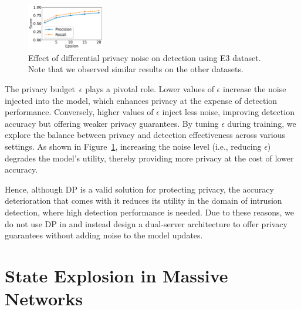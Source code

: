 \begin{figure}[!t]
  \centering
  \includegraphics[width=0.3\textwidth]{fig/epsvsscore.pdf}
  \caption{Effect of differential privacy noise on detection using E3 dataset. Note that we observed similar results on the other datasets.}
  \label{epsvsscore}
  \vspace{-2ex}
\end{figure}


The privacy budget~$\epsilon$ plays a pivotal role. Lower values of $\epsilon$ increase the noise injected into the model, which enhances privacy at the expense of detection performance. Conversely, higher values of $\epsilon$ inject less noise, improving detection accuracy but offering weaker privacy guarantees. By tuning $\epsilon$ during training, we explore the balance between privacy and detection effectiveness across various settings. As shown in Figure~\ref{epsvsscore}, increasing the noise level (i.e., reducing $\epsilon$) degrades the model’s utility, thereby providing more privacy at the cost of lower accuracy.

Hence, although DP is a valid solution for protecting privacy, the accuracy deterioration that comes with it reduces its utility in the domain of intrusion detection, where high detection performance is needed. Due to these reasons, we do not use DP in \Sys and instead design a dual-server architecture to offer privacy guarantees without adding noise to the model updates.

\section{State Explosion in Massive Networks}
\label{state:explosion}

